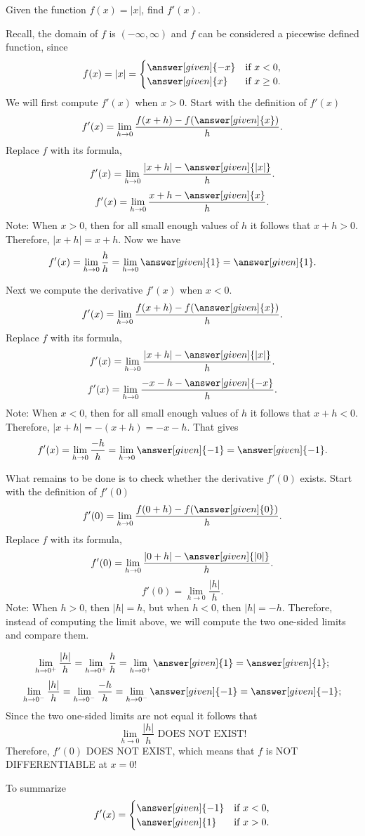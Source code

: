 \documentclass{ximera}
\begin{document}
\begin{example}
	Given the function $f(x) = |x|$, find  $f'(x)$. \\
	
	\begin{explanation}
		Recall, the  domain of $f$ is  $(-\infty, \infty)$ and $f$ can be considered a piecewise defined function, since
		\[ f(x) = |x|=
			\begin{cases}
			  \answer[given]{-x} &\text{if $x<0$,}\\
			  \answer[given]{x} &\text{if $x\ge 0$}.
			\end{cases} \]
		We will first compute $f'(x)$ when $x>0$.
		Start with the definition of $f'(x)$
		\[ f'(x) = \lim_{h\to0}\frac{f(x+h)-f(\answer[given]{x})}{h}.\]
		Replace $f$ with its formula,
		\[ f'(x) = \lim_{h\to0}\frac{|x+h|-\answer[given]{|x|}}{h}. \]
		\[ f'(x) = \lim_{h\to0}\frac{x+h-\answer[given]{x}}{h}.\]
		Note: When $x>0$, then for all small enough values of  $h$ it follows that $x+h>0$. 
		Therefore, $|x+h|=x+h$. Now we have
		\[ f'(x) = \lim_{h\to0}\frac{h}{h}= \lim_{h\to0}\answer[given]{1}=\answer[given]{1}.\]
		
		Next we compute the derivative $f'(x)$ when $x<0$.
		\[ f'(x) = \lim_{h\to0}\frac{f(x+h)-f(\answer[given]{x})}{h}. \]
		Replace $f$ with its formula,
		\[ f'(x) = \lim_{h\to0}\frac{|x+h|-\answer[given]{|x|}}{h}. \]
		\[ f'(x) = \lim_{h\to0}\frac{-x-h-\answer[given]{-x}}{h}. \]
		Note: When $x<0$, then for all small enough values of  $h$ it follows that $x+h<0$. 
		Therefore, $|x+h|=-(x+h)=-x-h$.
		That gives
		\[ f'(x) = \lim_{h\to0}\frac{-h}{h}= \lim_{h\to0}\answer[given]{-1}=\answer[given]{-1}.\]

		What remains to be done is to check whether the derivative $f'(0)$ exists.
		Start with the definition of $f'(0)$
		\[ f'(0) = \lim_{h\to0}\frac{f(0+h)-f(\answer[given]{0})}{h}. \]
		Replace $f$ with its formula,
		\[ f'(0) = \lim_{h\to0}\frac{|0+h|-\answer[given]{|0|}}{h}.\]
		\[ f'(0) = \lim_{h\to0}\frac{|h|}{h}. \]
		Note: When $h>0$, then $|h|=h$, but when $h<0$, then $|h|=-h$. 
		Therefore, instead of computing the limit above, we will compute the two one-sided limits and compare them.
		
		\[ \lim_{h\to0^+}\frac{|h|}{h}= \lim_{h\to0^+}\frac{h}{h}=\lim_{h\to0^+}\answer[given]{1}=\answer[given]{1}; \]
		\[ \lim_{h\to0^-}\frac{|h|}{h}= \lim_{h\to0^-}\frac{-h}{h}=\lim_{h\to0^-}\answer[given]{-1}=\answer[given]{-1};\]
		Since the two one-sided limits are not equal it follows that 
		\[ \lim_{h\to0}\frac{|h|}{h} {\text{           DOES NOT EXIST!}}\]
		Therefore,   $f'(0)$ DOES NOT EXIST, which means that $f$ is NOT DIFFERENTIABLE at $x=0$!

		To summarize		
		 \[ f'(x) =
			\begin{cases}
			 	\answer[given]{-1} &\text{if $x<0$,}\\
			 	\answer[given]{1} &\text{if $x> 0$}.
			\end{cases} \]
	\end{explanation}
\end{example}
\end{document}
